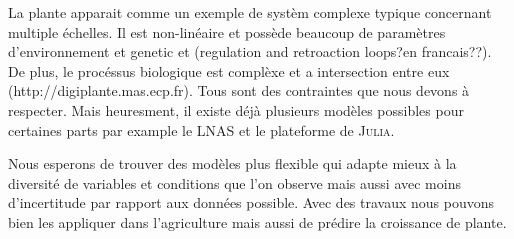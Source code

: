 La plante apparait comme un exemple de systèm complexe typique concernant 
multiple échelles. Il est non-linéaire et possède beaucoup de paramètres
d'environnement et genetic et (regulation and retroaction loops?en francais??).
De plus,  le procéssus biologique est complèxe et a intersection entre eux
(http://digiplante.mas.ecp.fr). Tous sont des contraintes que 
nous devons à respecter. Mais heuresment, 
il existe déjà plusieurs modèles possibles pour certaines parts 
par example le LNAS et le plateforme de \textsc{Julia}.

Nous esperons de trouver des modèles plus flexible qui adapte mieux à la diversité
de variables et conditions que l'on observe mais aussi avec moins d'incertitude 
par rapport aux données possible. Avec des travaux 
nous pouvons bien les appliquer dans l'agriculture 
mais aussi de prédire la croissance de plante.
